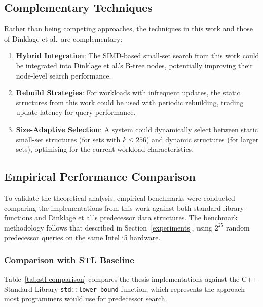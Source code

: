 \subsection{Complementary Techniques}

Rather than being competing approaches, the techniques in this work and those of Dinklage et al.\ are complementary:

\begin{enumerate}
    \item \textbf{Hybrid Integration}: The SIMD-based small-set search from this work could be integrated into Dinklage et al.'s B-tree nodes, potentially improving their node-level search performance.

    \item \textbf{Rebuild Strategies}: For workloads with infrequent updates, the static structures from this work could be used with periodic rebuilding, trading update latency for query performance.

    \item \textbf{Size-Adaptive Selection}: A system could dynamically select between static small-set structures (for sets with $k \leq 256$) and dynamic structures (for larger sets), optimising for the current workload characteristics.
\end{enumerate}

\subsection{Empirical Performance Comparison}
\label{sec:empirical-comparison}

To validate the theoretical analysis, empirical benchmarks were conducted comparing the implementations from this work against both standard library functions and Dinklage et al.'s predecessor data structures. The benchmark methodology follows that described in Section~\ref{experiments}, using $2^{25}$ random predecessor queries on the same Intel i5 hardware.

\subsubsection{Comparison with STL Baseline}

Table~\ref{tab:stl-comparison} compares the thesis implementations against the C++ Standard Library \texttt{std::lower\_bound} function, which represents the approach most programmers would use for predecessor search.

